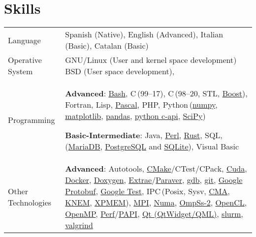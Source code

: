 \documentclass[a4paper,11pt]{article}
\def\CC{{C\nolinebreak[4]\hspace{-.05em}\raisebox{.2ex}{++}}}
\begin{document}
\section{Skills}
\begin{tabularx}{\linewidth}{@{}l X@{}}
  Language & Spanish (Native), English (Advanced), Italian (Basic), Catalan (Basic)\\
  Operative System & GNU/Linux (User and kernel space development) BSD (User space development), \\
  Programming & \textbf{Advanced}: \href{https://www.gnu.org/software/bash/}{Bash},
                C\,(99--17), \CC\,(98--20, STL, \href{https://www.boost.org/}{Boost}), Fortran, Lisp,
                \href{https://www.freepascal.org/}{Pascal}, PHP,
                Python\,(\href{https://numpy.org/}{numpy},
                \href{https://matplotlib.org/}{matplotlib},
                \href{https://pandas.pydata.org/}{pandas},
                \href{https://docs.python.org/3/c-api/index.html}{python c-api},
                \href{https://scipy.org/}{SciPy})

                \textbf{Basic-Intermediate}: Java,
                \href{https://www.perl.org/}{Perl},
                \href{https://www.rust-lang.org/}{Rust},
                SQL,
                (\href{https://mariadb.org/}{MariaDB},
                \href{https://www.postgresql.org/}{PostgreSQL} and
                \href{https://www.sqlite.org/index.html}{SQLite}), Visual Basic  \\

  Other Technologies & \textbf{Advanced}:
                       Autotools,
                       \href{https://cmake.org/}{CMake}/CTest/CPack,
                       \href{https://developer.nvidia.com/cuda-zone}{Cuda},
                       \href{https://www.docker.com/}{Docker},
                       \href{https://doxygen.nl/}{Doxygen},
                       \href{https://tools.bsc.es/extrae}{Extrae}/\href{https://tools.bsc.es/paraver}{Paraver},
                       \href{https://www.sourceware.org/gdb/}{gdb},
                       \href{https://git-scm.com/}{git},
                       \href{https://developers.google.com/protocol-buffers}{Google Protobuf},
                       \href{https://github.com/google/googletest}{Google Test},
                       IPC\,(Posix, Sysv,
                       \href{https://lwn.net/Articles/405284/}{CMA},
                       \href{https://knem.gitlabpages.inria.fr/}{KNEM},
                       \href{https://github.com/hpc/xpmem}{XPMEM}),
                       \href{https://www.mpi-forum.org/}{MPI},
                       \href{https://www.kernel.org/doc/html/v4.19/vm/numa.html}{Numa},
                       \href{https://pm.bsc.es/ompss-2}{OmpSs-2},
                       \href{https://www.khronos.org/api/opencl}{OpenCL},
                       \href{https://www.openmp.org/}{OpenMP},
                       \href{https://perf.wiki.kernel.org/index.php/Main_Page}{Perf}/\href{https://icl.utk.edu/papi/}{PAPI},
                       \href{https://www.qt.io/}{Qt (QtWidget/QML)},
                       \href{https://slurm.schedmd.com/}{slurm},
                       \href{https://valgrind.org/}{valgrind}


\end{tabularx}
\end{document}
